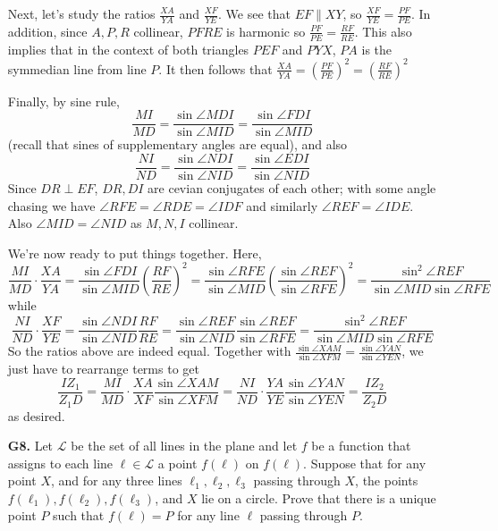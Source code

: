 \documentclass[11pt,a4paper]{article}
\begin{document}
\begin{enumerate}
	Next, let's study the ratios $\frac{XA}{YA}$ and $\frac{XF}{YE}$. 
	We see that $EF\parallel XY$, so $\frac{XF}{YE} = \frac{PF}{PE}$. 
	In addition, since $A, P, R$ collinear, $PFRE$ is harmonic so 
	$\frac{PF}{PE} = \frac{RF}{RE}$. 
	This also implies that in the context of both triangles $PEF$ and $PYX$, $PA$ is the symmedian line from line $P$. 
	It then follows that $\frac{XA}{YA}=(\frac{PF}{PE})^2 = (\frac{RF}{RE})^2$
	
	Finally, by sine rule, 
	\begin{equation}
		\frac{MI}{MD}
		=\frac{\sin\angle MDI}{\sin\angle MID}
		=\frac{\sin\angle FDI}{\sin\angle MID}
	\end{equation}
	(recall that sines of supplementary angles are equal), 
	and also 
	\begin{equation}
		\frac{NI}{ND}
		=\frac{\sin\angle NDI}{\sin\angle NID}
		=\frac{\sin\angle EDI}{\sin\angle NID}
	\end{equation}
	Since $DR\perp EF$, $DR, DI$ are cevian conjugates of each other; 
	with some angle chasing we have $\angle RFE = \angle RDE = \angle IDF$ and similarly 
	$\angle REF = \angle IDE$. Also $\angle MID = \angle NID$ as $M, N, I$ collinear. 
	
	We're now ready to put things together. Here, 
	\begin{equation}
		\frac{MI}{MD}\cdot \frac{XA}{YA}
		=\frac{\sin\angle FDI}{\sin\angle MID}\left(\frac{RF}{RE}\right)^2
		=\frac{\sin\angle RFE}{\sin\angle MID}\left(\frac{\sin\angle REF}{\sin\angle RFE}\right)^2
		=\frac{\sin^2\angle REF}{\sin\angle MID\sin\angle RFE}
	\end{equation}
	while 
	\begin{equation}
		\frac{NI}{ND}\cdot \frac{XF}{YE}
		=\frac{\sin\angle NDI}{\sin\angle NID}\frac{RF}{RE}
		=\frac{\sin\angle REF}{\sin\angle NID}\frac{\sin\angle REF}{\sin\angle RFE}
		=\frac{\sin^2\angle REF}{\sin\angle MID\sin\angle RFE}
	\end{equation}
	So the ratios above are indeed equal. 
	Together with $\frac{\sin\angle XAM}{\sin\angle XFM} = \frac{\sin\angle YAN}{\sin\angle YEN}$, 
	we just have to rearrange terms to get 
	\begin{equation}
		\frac{IZ_1}{Z_1D}
		=\frac{MI}{MD}\cdot \frac{XA}{XF}\frac{\sin\angle XAM}{\sin\angle XFM}
		=\frac{NI}{ND}\cdot \frac{YA}{YE}\frac{\sin\angle YAN}{\sin\angle YEN}
		=\frac{IZ_2}{Z_2D}
	\end{equation}
	as desired. 
	
	\item [\textbf{G8.}] Let $\mathcal L$ be the set of all lines in the plane and let $f$ be a function that assigns to each line $\ell\in\mathcal L$ a point $f(\ell)$ on $f(\ell)$. Suppose that for any point $X$, and for any three lines $\ell_1,\ell_2,\ell_3$ passing through $X$, the points $f(\ell_1),f(\ell_2),f(\ell_3)$, and $X$ lie on a circle.
	Prove that there is a unique point $P$ such that $f(\ell)=P$ for any line $\ell$ passing through $P$.
	

\end{enumerate}
\end{document}
